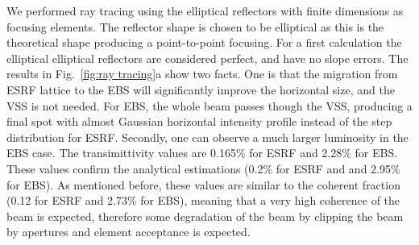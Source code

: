 \documentclass{iucr}              %
\begin{document}
We performed ray tracing using the elliptical reflectors with finite dimensions as focusing elements. The reflector shape is chosen to be elliptical as this is the theoretical shape producing a point-to-point focusing. For a first calculation  the elliptical elliptical reflectors are considered perfect, and have no slope errors. 
The results in Fig.~\ref{fig:ray tracing}a show two facts. One is that the migration from ESRF lattice to the EBS will significantly improve the horizontal size, and the VSS is not needed. For EBS, the whole beam passes though the VSS, producing a final spot with almost Gaussian horizontal intensity profile instead of the step distribution for ESRF. Secondly, one can observe a much larger luminosity in the EBS case. The transimittivity values are 0.165\% for ESRF and 2.28\% for EBS. These values confirm the analytical estimations (0.2\% for ESRF and and 2.95\% for EBS). As mentioned before, these values are similar to the coherent fraction \cite{arxivCF} (0.12 for ESRF and 2.73\% for EBS), meaning that a very high coherence of the beam is expected, therefore some degradation of the beam by clipping the beam by apertures and element acceptance is expected. 
\end{document}
